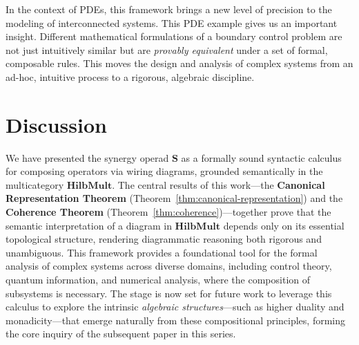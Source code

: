 \documentclass[11pt]{article}
\begin{document}
In the context of PDEs, this framework brings a new level of precision to the modeling of interconnected systems. This PDE example gives us an important insight. Different mathematical formulations of a boundary control problem are not just intuitively similar but are \textit{provably equivalent} under a set of formal, composable rules. This moves the design and analysis of complex systems from an ad-hoc, intuitive process to a rigorous, algebraic discipline.

\section{Discussion}

We have presented the synergy operad $\mathbf{S}$ as a formally sound syntactic calculus for composing operators via wiring diagrams, grounded semantically in the multicategory $\mathbf{HilbMult}$. The central results of this work—the \textbf{Canonical Representation Theorem} (Theorem~\ref{thm:canonical-representation}) and the \textbf{Coherence Theorem} (Theorem~\ref{thm:coherence})—together prove that the semantic interpretation of a diagram in $\mathbf{HilbMult}$ depends only on its essential topological structure, rendering diagrammatic reasoning both rigorous and unambiguous. This framework provides a foundational tool for the formal analysis of complex systems across diverse domains, including control theory, quantum information, and numerical analysis, where the composition of subsystems is necessary. The stage is now set for future work to leverage this calculus to explore the intrinsic \textit{algebraic structures}—such as higher duality and monadicity—that emerge naturally from these compositional principles, forming the core inquiry of the subsequent paper in this series.








\end{document}
